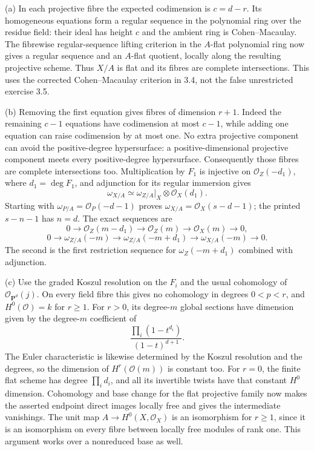 \documentclass[11pt]{article}
\let\chapterexercise\exercise
\renewcommand{\exercise}[2]{\Needspace{8\baselineskip}\chapterexercise{#1}{#2}}
\begin{document}
\pf
(a) In each projective fibre the expected codimension is $c=d-r$. Its homogeneous equations form a regular sequence in the polynomial ring over the residue field: their ideal has height $c$ and the ambient ring is Cohen--Macaulay. The fibrewise regular-sequence lifting criterion in the $A$-flat polynomial ring now gives a regular sequence and an $A$-flat quotient, locally along the resulting projective scheme. Thus $X/A$ is flat and its fibres are complete intersections. This uses the corrected Cohen--Macaulay criterion in 3.4, not the false unrestricted exercise 3.5.

(b) Removing the first equation gives fibres of dimension $r+1$. Indeed the remaining $c-1$ equations have codimension at most $c-1$, while adding one equation can raise codimension by at most one. No extra projective component can avoid the positive-degree hypersurface: a positive-dimensional projective component meets every positive-degree hypersurface. Consequently those fibres are complete intersections too. Multiplication by $F_1$ is injective on $\mathcal O_Z(-d_1)$, where $d_1=\deg F_1$, and adjunction for its regular immersion gives
\[ \omega_{X/A}\simeq\omega_{Z/A}|_X\otimes\mathcal O_X(d_1). \]
Starting with $\omega_{P/A}=\mathcal O_P(-d-1)$ proves $\omega_{X/A}=\mathcal O_X(s-d-1)$; the printed $s-n-1$ has $n=d$. The exact sequences are
\[ 0\to\mathcal O_Z(m-d_1)\to\mathcal O_Z(m)\to\mathcal O_X(m)\to0, \]
\[ 0\to\omega_{Z/A}(-m)\to\omega_{Z/A}(-m+d_1)\to\omega_{X/A}(-m)\to0. \]
The second is the first restriction sequence for $\omega_Z(-m+d_1)$ combined with adjunction.

(c) Use the graded Koszul resolution on the $F_i$ and the usual cohomology of $\mathcal O_{\mathbf P^d}(j)$. On every field fibre this gives no cohomology in degrees $0<p<r$, and $H^0(\mathcal O)=k$ for $r\ge1$. For $r>0$, its degree-$m$ global sections have dimension given by the degree-$m$ coefficient of
\[ \frac{\prod_i(1-t^{d_i})}{(1-t)^{d+1}}. \]
The Euler characteristic is likewise determined by the Koszul resolution and the degrees, so the dimension of $H^r(\mathcal O(m))$ is constant too. For $r=0$, the finite flat scheme has degree $\prod_i d_i$, and all its invertible twists have that constant $H^0$ dimension. Cohomology and base change for the flat projective family now makes the asserted endpoint direct images locally free and gives the intermediate vanishings. The unit map $A\to H^0(X,\mathcal O_X)$ is an isomorphism for $r\ge1$, since it is an isomorphism on every fibre between locally free modules of rank one. This argument works over a nonreduced base as well.
\end{document}
